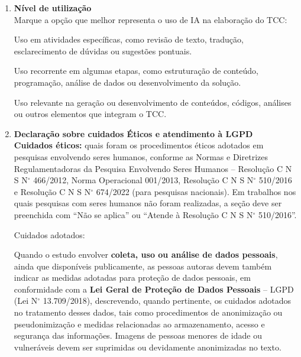 \begin{anexosenv}
\begin{enumerate}
\vspace{0.42cm}
\textbf{Ferramenta utilizadas:} \formline{10.55cm}

\vspace{0.48cm}
\formline{15.25cm}

\vspace*{0.45cm}

\item \textbf{Nível de utilização}\\
\noindent Marque a opção que melhor representa o uso de IA na elaboração do TCC:

\vspace{0.38cm}
Uso em atividades específicas, como revisão de texto, tradução, esclarecimento de dúvidas ou sugestões pontuais.

\vspace{0.38cm}
Uso recorrente em algumas etapas, como estruturação de conteúdo, programação, análise de dados ou desenvolvimento da solução.

\vspace{0.38cm}
Uso relevante na geração ou desenvolvimento de conteúdos, códigos, análises ou outros elementos que integram o TCC.

\vspace{0.72cm}
\item \textbf{Declaração sobre cuidados Éticos e atendimento à LGPD}\\
\textbf{Cuidados éticos:} quais foram os procedimentos éticos adotados em pesquisas envolvendo seres humanos, conforme as Normas e Diretrizes Regulamentadoras da Pesquisa Envolvendo Seres Humanos -- Resolução C N S N$^\circ$ 466/2012, Norma Operacional 001/2013, Resolução C N S N$^\circ$ 510/2016 e Resolução C N S N$^\circ$ 674/2022 (para pesquisas nacionais). Em trabalhos nos quais pesquisas com seres humanos não foram realizadas, a seção deve ser preenchida com ``Não se aplica'' ou ``Atende à Resolução C N S N$^\circ$ 510/2016''.

\vspace{0.4cm}
\vspace{0.12cm}
\noindent\checkbox\hspace{0.12cm}Cuidados adotados: \formline{10.7cm}

\vspace{0.42cm}
\formline{15.25cm}

\vspace{0.60cm}
Quando o estudo envolver \textbf{coleta, uso ou análise de dados pessoais}, ainda que disponíveis publicamente, as pessoas autoras devem também indicar as medidas adotadas para proteção de dados pessoais, em conformidade com a \textbf{Lei Geral de Proteção de Dados Pessoais} -- LGPD (Lei N$^\circ$ 13.709/2018), descrevendo, quando pertinente, os cuidados adotados no tratamento desses dados, tais como procedimentos de anonimização ou pseudonimização e medidas relacionadas ao armazenamento, acesso e segurança das informações. Imagens de pessoas menores de idade ou vulneráveis devem ser suprimidas ou devidamente anonimizadas no texto.


\end{enumerate}
\end{anexosenv}
